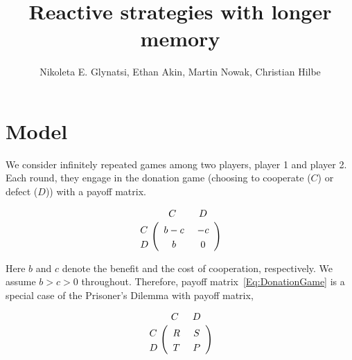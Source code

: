 \documentclass{article}
\title{Reactive strategies with longer memory}
\author{Nikoleta E. Glynatsi, Ethan Akin, Martin Nowak, Christian Hilbe}
\date{}
\theoremstyle{definition}
\begin{document}
\maketitle




\section{Model}

We consider infinitely repeated games among two players, player 1 and player 2.
Each round, they engage in the donation game (choosing to cooperate ($C$) or
defect ($D$)) with a payoff matrix.


\begin{align} \label{Eq:DonationGame}
  \bordermatrix{%
    & C & D \cr
    C &\ b - c &\ -c\  \cr
    D &\ b &\ 0\ \cr
  }
\end{align}

Here $b$ and $c$ denote the benefit and the cost of cooperation, respectively. 
We assume $b\!>\!c\!>\!0$ throughout.
Therefore, payoff matrix~\eqref{Eq:DonationGame} is a special case of the
Prisoner's Dilemma with payoff matrix,

\begin{align}\label{Eq:PrisonerDilemma}
  \bordermatrix{%
    & C & D \cr
    C &\ R &\ S\  \cr
    D &\ T &\ P\ \cr
  }
\end{align}
\end{document}
